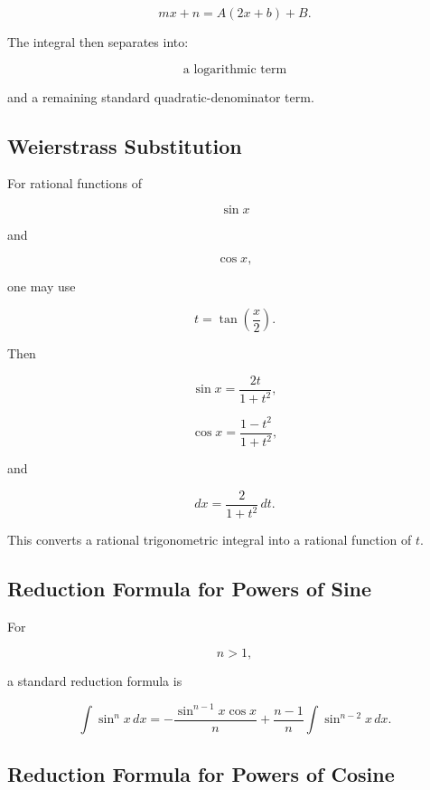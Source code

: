 \[
mx+n
=
A(2x+b)+B.
\]

The integral then separates into:

\[
\boxed{
\text{a logarithmic term}
}
\]

and a remaining standard quadratic-denominator term.

\subsection{Weierstrass Substitution}
\label{subsec:weierstrass-integral-reference}

For rational functions of

\[
\sin x
\]

and

\[
\cos x,
\]

one may use

\[
\boxed{
t
=
\tan\left(\frac{x}{2}\right).
}
\]

Then

\[
\boxed{
\sin x
=
\frac{
2t
}{
1+t^2
},
}
\]

\[
\boxed{
\cos x
=
\frac{
1-t^2
}{
1+t^2
},
}
\]

and

\[
\boxed{
dx
=
\frac{
2
}{
1+t^2
}
\,dt.
}
\]

This converts a rational trigonometric integral into a rational function of
\(t\).

\subsection{Reduction Formula for Powers of Sine}
\label{subsec:sine-reduction-formula}

For

\[
n>1,
\]

a standard reduction formula is

\[
\boxed{
\int\sin^n x\,dx
=
-\frac{
\sin^{n-1}x\cos x
}{
n
}
+
\frac{
n-1
}{
n
}
\int
\sin^{n-2}x
\,dx.
}
\]

\subsection{Reduction Formula for Powers of Cosine}
\label{subsec:cosine-reduction-formula}


